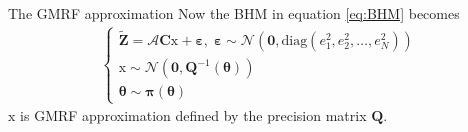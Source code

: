 \documentclass{beamer}
\begin{document}
\begin{frame}{The GMRF approximation}
Now the BHM in equation \eqref{eq:BHM} becomes
\begin{align}\label{eq:BHM_gmrf}
\left\{ \begin{array}{l}
\bm{\tilde{Z}} = \bm{\mathcal{A}}\bm{C}\bm{\mathrm{x}} + \bm{\varepsilon}, \; 
\bm{\varepsilon} \sim \mathcal{N} (\bm{0}, \mbox{diag}(e_1^2, e_2^2, \dots, e_N^2)) \\
\bm{\mathrm{x}} \sim \mathcal{N}(\bm{0}, \bm{Q}^{-1}(\bm{\theta})) \\
\bm{\theta} \sim \bm{\pi}(\bm{\theta})
\end{array} \right.
\end{align}
$\bm{\mathrm{x}} $ is GMRF approximation defined by the precision matrix $\bm{Q}$.

\end{frame}
\end{document}
